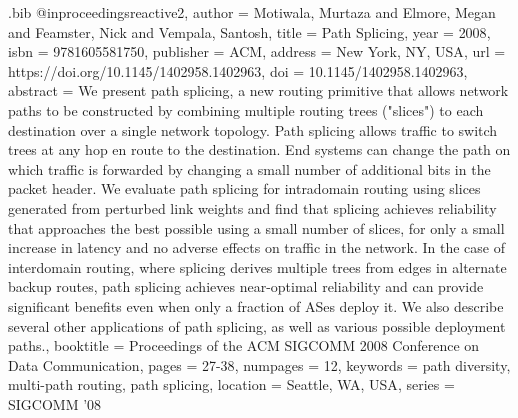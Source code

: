 \documentclass[sigconf]{acmart}
\begin{document}
\begin{filecontents}{\jobname.bib}
@inproceedings{reactive2, author = {Motiwala, Murtaza and Elmore, Megan and Feamster, Nick and Vempala, Santosh}, title = {Path Splicing}, year = {2008}, isbn = {9781605581750}, publisher = {ACM}, address = {New York, NY, USA}, url = {https://doi.org/10.1145/1402958.1402963}, doi = {10.1145/1402958.1402963}, abstract = {We present path splicing, a new routing primitive that allows network paths to be constructed by combining multiple routing trees ("slices") to each destination over a single network topology. Path splicing allows traffic to switch trees at any hop en route to the destination. End systems can change the path on which traffic is forwarded by changing a small number of additional bits in the packet header. We evaluate path splicing for intradomain routing using slices generated from perturbed link weights and find that splicing achieves reliability that approaches the best possible using a small number of slices, for only a small increase in latency and no adverse effects on traffic in the network. In the case of interdomain routing, where splicing derives multiple trees from edges in alternate backup routes, path splicing achieves near-optimal reliability and can provide significant benefits even when only a fraction of ASes deploy it. We also describe several other applications of path splicing, as well as various possible deployment paths.}, booktitle = {Proceedings of the ACM SIGCOMM 2008 Conference on Data Communication}, pages = {27-38}, numpages = {12}, keywords = {path diversity, multi-path routing, path splicing}, location = {Seattle, WA, USA}, series = {SIGCOMM '08} }
 




\end{filecontents}
\end{document}
